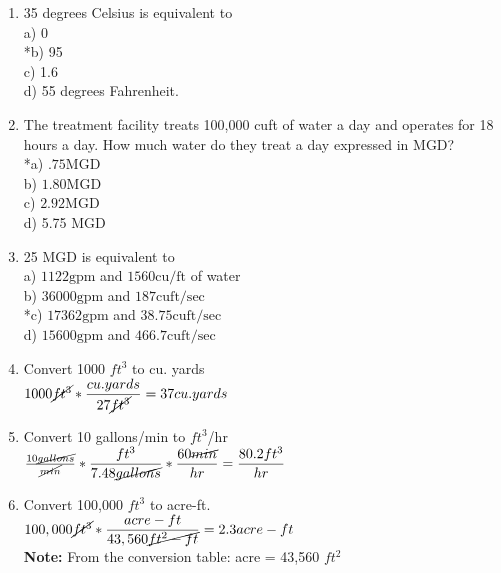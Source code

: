 \documentclass{article}
\begin{document}
\begin{enumerate}

  \item 35 degrees Celsius is equivalent to\\
a) 0\\
*b) 95\\
c) 1.6\\
d) 55 degrees Fahrenheit.\\

      \item The treatment facility treats 100,000 cuft of water a day and operates for 18 hours a day. How much water do they treat a day expressed in MGD?\\
*a) $.75 \mathrm{MGD}$\\
b) $1.80 \mathrm{MGD}$\\
c) $2.92 \mathrm{MGD}$\\
d) 5.75 MGD\\
     \item 25 MGD is equivalent to\\

a) $1122 \mathrm{gpm}$ and $1560 \mathrm{cu} / \mathrm{ft}$ of water\\
b) $36000 \mathrm{gpm}$ and $187 \mathrm{cuft} / \mathrm{sec}$\\
*c) $17362 \mathrm{gpm}$ and $38.75 \mathrm{cuft} / \mathrm{sec}$\\
d) $15600 \mathrm{gpm}$ and $466.7 \mathrm{cuft} / \mathrm{sec}$\\

\item Convert 1000 $ft^3$ to cu. yards\\


$1000 \cancel{ft^3}*\dfrac{cu.yards}{27\cancel{ft^3}} = 37 cu.yards$


\item Convert 10 gallons/min to $ft^3$/hr\\


$\frac{10 \cancel{gallons}}{\cancel{min}}*  \dfrac{ft^3}{7.48 \cancel{gallons}}  * \dfrac{60 \cancel{min}}{hr}   = \dfrac{80.2 ft^3}{hr}$

\item Convert 100,000 $ft^3$ to acre-ft.\\



$100,000 \cancel{ft^3} * \dfrac{acre-ft}{43,560 \cancel{ft^2-ft}} =  2.3 acre-ft$\\

\textbf{Note:} From the conversion table: acre = 43,560 $ft^2$\\


\end{enumerate}
\end{document}
